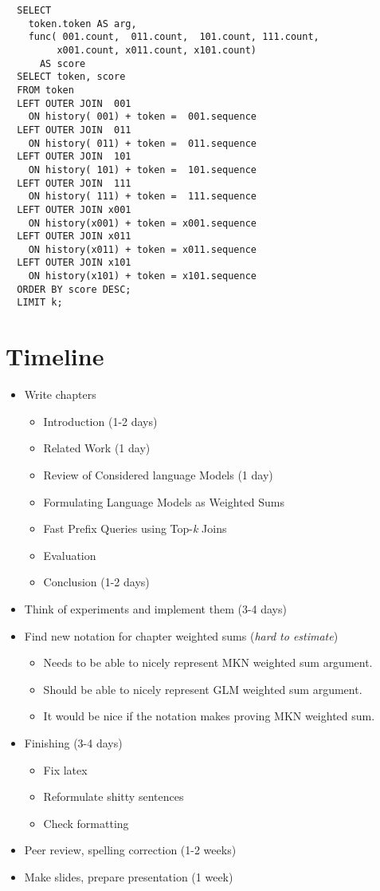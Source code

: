 \begin{lstlisting}
  SELECT
    token.token AS arg,
    func( 001.count,  011.count,  101.count, 111.count,
         x001.count, x011.count, x101.count)
      AS score
  SELECT token, score
  FROM token
  LEFT OUTER JOIN  001
    ON history( 001) + token =  001.sequence
  LEFT OUTER JOIN  011
    ON history( 011) + token =  011.sequence
  LEFT OUTER JOIN  101
    ON history( 101) + token =  101.sequence
  LEFT OUTER JOIN  111
    ON history( 111) + token =  111.sequence
  LEFT OUTER JOIN x001
    ON history(x001) + token = x001.sequence
  LEFT OUTER JOIN x011
    ON history(x011) + token = x011.sequence
  LEFT OUTER JOIN x101
    ON history(x101) + token = x101.sequence
  ORDER BY score DESC;
  LIMIT k;
\end{lstlisting}


\chapter{Timeline}

\begin{itemize}
  \item Write chapters
    \begin{itemize}
      \item Introduction (1-2 days)
      \item Related Work (1 day)
      \item Review of Considered language Models (1 day)
      \item Formulating Language Models as Weighted Sums
      \item Fast Prefix Queries using Top-\emph{k} Joins
      \item Evaluation
      \item Conclusion (1-2 days)
    \end{itemize}
  \item Think of experiments and implement them (3-4 days)
  \item Find new notation for chapter weighted sums (\emph{hard to estimate})
    \begin{itemize}
      \item Needs to be able to nicely represent MKN weighted sum argument.
      \item Should be able to nicely represent GLM weighted sum argument.
      \item It would be nice if the notation makes proving MKN weighted sum.
    \end{itemize}
  \item Finishing (3-4 days)
    \begin{itemize}
      \item Fix latex
      \item Reformulate shitty sentences
      \item Check formatting
    \end{itemize}
  \item Peer review, spelling correction (1-2 weeks)
  \item Make slides, prepare presentation (1 week)
\end{itemize}

